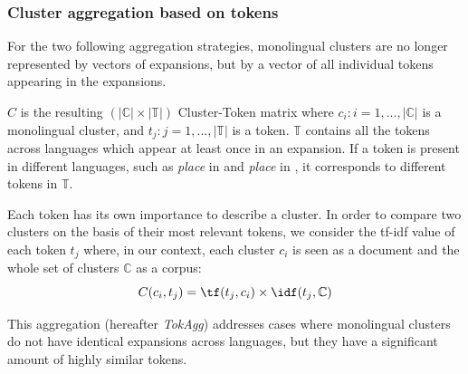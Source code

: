 \documentclass[output=paper]{langsci/langscibook}
\begin{document}
\subsubsection{Cluster aggregation based on tokens}

\label{jac:cluster representation}

For the two following aggregation strategies, monolingual clusters are
no lon\-ger represented by vectors of expansions, but by a vector of all
individual tokens appearing in the expansions.

$C$ is the resulting $(|\mathbb{C}| \times |\mathbb{T}|)$
Cluster-Token matrix where $c_i : i = 1,...,|\mathbb{C}|$ is a
monolingual cluster, and $t_j : j = 1,...,|\mathbb{T}|$ is a
token. $\mathbb{T}$ contains all the tokens across languages which
appear at least once in an expansion.  If a token is present in
different languages, such as \textit{place} in  and
\textit{place} in , it corresponds to different tokens in
$\mathbb{T}$.

Each token has its own importance to describe a cluster. In order to
compare two clusters on the basis of their most relevant tokens, we
consider the tf-idf value of each token $t_j$ where, in our context,
each cluster $c_i$ is seen as a document and the whole set of clusters
$\mathbb{C}$ as a corpus:
\begin{equation}\label{jac:eq:tfidf}
C(c_i,t_j) = \tf(t_j,c_i) \times \idf(t_j,\mathbb{C})
\end{equation}

\label{jac:similar}

This aggregation (hereafter \textit{TokAgg}) addresses cases where 
monolingual clusters do not have identical expansions across languages, but they 
have a significant amount of highly similar tokens.


\end{document}
